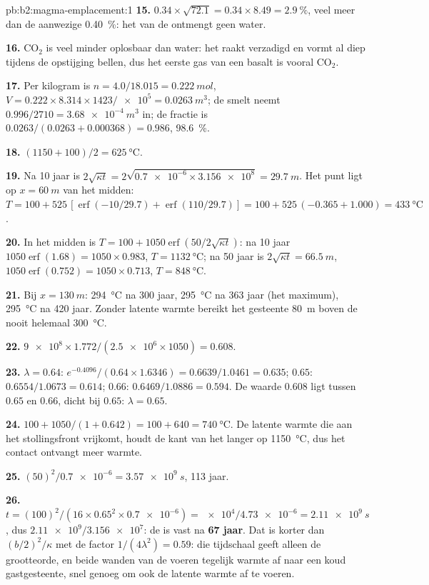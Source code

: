 \begin{solution}{pb:b2:magma-emplacement:1}
\textbf{15.} $0.34\times\sqrt{72.1} = 0.34\times8.49 = \qty{2.9}{\percent}$, veel meer dan
de aanwezige \qty{0.40}{\percent}: het  van de  ontmengt geen water.

\textbf{16.} CO$_2$ is veel minder oplosbaar dan water: het raakt verzadigd en vormt al diep
tijdens de opstijging bellen, dus het eerste gas van een basalt is vooral CO$_2$.

\textbf{17.} Per kilogram is $n = 4.0/18.015 = \qty{0.222}{mol}$, $V = 0.222\times8.314\times1423/
\num{e5} = \qty{0.0263}{m^3}$; de smelt neemt $0.996/2710 = \qty{3.68e-4}{m^3}$ in; de
fractie is $0.0263/(0.0263 + 0.000368) = 0.986$, \qty{98.6}{\percent}.

\textbf{18.} $(1150 + 100)/2 = \qty{625}{\celsius}$.

\textbf{19.} Na 10 jaar is $2\sqrt{\kappa t} = 2\sqrt{\num{0.7e-6}\times\num{3.156e8}} =
\qty{29.7}{m}$. Het punt ligt op $x = \qty{60}{m}$ van het midden: $T = 100 +
525\,[\operatorname{erf}(-10/29.7) + \operatorname{erf}(110/29.7)] = 100 + 525\,(-0.365 +
1.000) = \qty{433}{\celsius}$.

\textbf{20.} In het midden is $T = 100 + 1050\operatorname{erf}(50/2\sqrt{\kappa t})$: na
10 jaar $1050\operatorname{erf}(1.68) = 1050\times0.983$, $T = \qty{1132}{\celsius}$; na
50 jaar is $2\sqrt{\kappa t} = \qty{66.5}{m}$, $1050\operatorname{erf}(0.752) = 1050\times0.713$,
$T = \qty{848}{\celsius}$.

\textbf{21.} Bij $x = \qty{130}{m}$: \qty{294}{\celsius} na 300 jaar,
\qty{295}{\celsius} na 363 jaar (het maximum), \qty{295}{\celsius} na 420
jaar. Zonder latente warmte bereikt het gesteente \qty{80}{m} boven de  nooit helemaal
\qty{300}{\celsius}.

\textbf{22.} $\num{9e8}\times1.772/(\num{2.5e6}\times1050) = 0.608$.

\textbf{23.} $\lambda = 0.64$: $e^{-0.4096}/(0.64\times1.6346) = 0.6639/1.0461 = 0.635$;
$0.65$: $0.6554/1.0673 = 0.614$; $0.66$: $0.6469/1.0886 = 0.594$. De waarde $0.608$
ligt tussen $0.65$ en $0.66$, dicht bij $0.65$: $\lambda = 0.65$.

\textbf{24.} $100 + 1050/(1 + 0.642) = 100 + 640 = \qty{740}{\celsius}$. De latente
warmte die aan het stollingsfront vrijkomt, houdt de kant van het  langer op
\qty{1150}{\celsius}, dus het contact ontvangt meer warmte.

\textbf{25.} $(50)^2/\num{0.7e-6} = \qty{3.57e9}{s}$, 113 jaar.

\textbf{26.} $t = (100)^2/(16\times0.65^2\times\num{0.7e-6}) = \num{e4}/\num{4.73e-6} =
\qty{2.11e9}{s}$, dus $\num{2.11e9}/\num{3.156e7}$: de  is vast na
\textbf{\qty[text-series-to-math=true]{67}{} jaar}. Dat is korter dan
$(b/2)^2/\kappa$ met de factor $1/(4\lambda^2) = 0.59$: die tijdschaal geeft alleen
de grootteorde, en beide wanden van de  voeren tegelijk warmte af naar een koud gastgesteente,
snel genoeg om ook de latente warmte af te voeren.
\end{solution}
